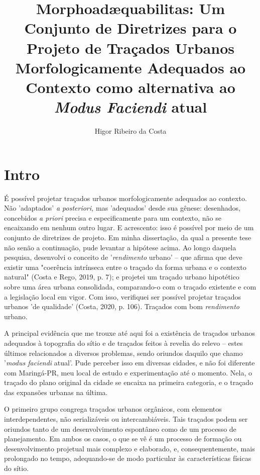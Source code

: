 \documentclass[]{report}
\title{\textbf{Morphoadæquabilitas}: Um Conjunto de Diretrizes para o Projeto de Traçados Urbanos Morfologicamente Adequados ao Contexto como alternativa ao \textit{Modus Faciendi} atual}
\author{Higor Ribeiro da Costa}
\begin{document}
\maketitle

\tableofcontents

\begin{abstract}
\end{abstract}

\onehalfspacing

\setcounter{secnumdepth}{0}
	\chapter{Intro}

	É possível projetar traçados urbanos morfologicamente adequados ao contexto. Não 'adaptados' \textit{a posteriori,} mas 'adequados' desde sua gênese: desenhados, concebidos \textit{a priori} precisa e especificamente para um contexto, não se encaixando em nenhum outro lugar. E acrescento: isso é possível por meio de um conjunto de diretrizes de projeto. Em minha dissertação, da qual a presente tese não senão a continuação, pude levantar a hipótese acima. Ao longo daquela pesquisa, desenvolvi o conceito de '\textit{rendimento} urbano' – que afirma que deve existir uma "coerência intrínseca entre o traçado da forma urbana e o contexto natural" (Costa e Rego, 2019, p. 7); e projetei um traçado urbano hipotético sobre uma área urbana consolidada, comparando-o com o traçado existente e com a legislação local em vigor. Com isso, verifiquei ser possível projetar traçados urbanos 'de qualidade' (Costa, 2020, p. 106). Traçados com bom \textit{rendimento} urbano.

	A principal evidência que me trouxe até aqui foi a existência de traçados urbanos adequados à topografia do sítio e de traçados feitos à revelia do relevo – estes últimos relacionados a diversos problemas, sendo oriundos daquilo que chamo '\textit{modus faciendi} atual'. Pude perceber isso em diversas cidades, e não foi diferente com Maringá-PR, meu local de estudo e experimentação até o momento. Nela, o traçado do plano original da cidade se encaixa na primeira categoria, e o traçado das expansões urbanas na última. 

	O primeiro grupo congrega traçados urbanos orgânicos, com elementos interdependentes, não serializáveis ou intercambiáveis. Tais traçados podem ser oriundos tanto de um desenvolvimento espontâneo como de um processo de planejamento. Em ambos os casos, o que se vê é um processo de formação ou desenvolvimento projetual mais complexo e elaborado, e, consequentemente, mais prolongado no tempo, adequando-se de modo particular às características físicas do sítio. 
\end{document}
